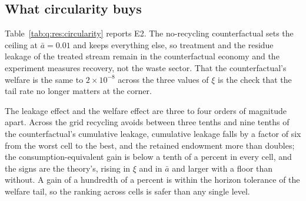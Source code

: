 \subsection{What circularity buys}\label{sec:q:res:circularity}

Table~\ref{tab:q:res:circularity} reports E2. The no-recycling counterfactual sets the ceiling at $\bar a=0.01$ and keeps everything else, so treatment and the residue leakage of the treated stream remain in the counterfactual economy and the experiment measures recovery, not the waste sector. That the counterfactual's welfare is the same to $2\times10^{-8}$ across the three values of $\xi$ is the check that the tail rate no longer matters at the corner.



The leakage effect and the welfare effect are three to four orders of magnitude apart. Across the grid recycling avoids between three tenths and nine tenths of the counterfactual's cumulative leakage, cumulative leakage falls by a factor of six from the worst cell to the best, and the retained endowment more than doubles; the consumption-equivalent gain is below a tenth of a percent in every cell, and the signs are the theory's, rising in $\xi$ and in $\bar a$ and larger with a floor than without. A gain of a hundredth of a percent is within the horizon tolerance of the welfare tail, so the ranking across cells is safer than any single level.

